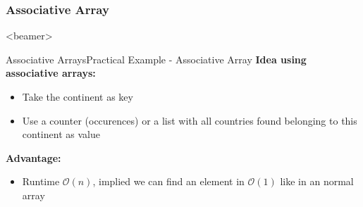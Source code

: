 \subsubsection{Associative Array}

\begin{frame}<beamer>{\LectureToC}
\end{frame}

\begin{frame}{Associative Arrays}{Practical Example - Associative Array}
  \textbf{Idea using associative arrays:}
  \begin{itemize}
    \item
      Take the continent as {\color{Mittel-Blau}key}
    \item
      Use a counter (occurences) or a list with all countries found belonging
      to this continent as {\color{Mittel-Blau}value}
  \end{itemize}
  \textbf{Advantage:}
  \begin{itemize}
    \item
      Runtime $\mathcal{O}(n)$, implied we can find an element in 
      $\mathcal{O}(1)$ like in an normal array
  \end{itemize}
\end{frame}






